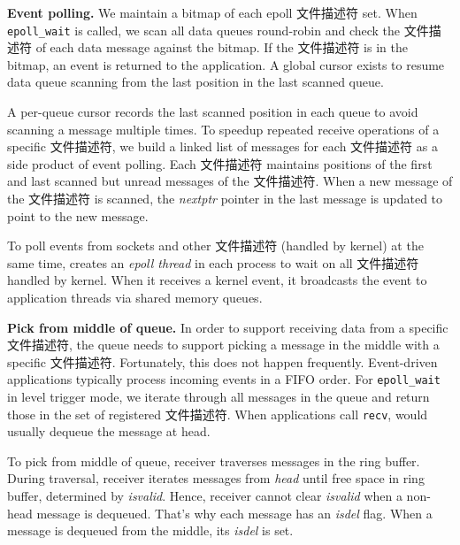 \textbf{Event polling.}
We maintain a bitmap of each epoll 文件描述符 set.
When \texttt{epoll\_wait} is called, we scan all data queues round-robin and check the 文件描述符 of each data message against the bitmap. If the 文件描述符 is in the bitmap, an event is returned to the application.
A global cursor exists to resume data queue scanning from the last position in the last scanned queue.

A per-queue cursor records the last scanned position in each queue to avoid scanning a message multiple times.
To speedup repeated receive operations of a specific 文件描述符, we build a linked list of messages for each 文件描述符 as a side product of event polling.
Each 文件描述符 maintains positions of the first and last scanned but unread messages of the 文件描述符.
When a new message of the 文件描述符 is scanned, the \emph{nextptr} pointer in the last message is updated to point to the new message.

To poll events from sockets and other 文件描述符 (handled by kernel) at the same time, \libipc{} creates an \textit{epoll thread} in each process to wait on all 文件描述符 handled by kernel. When it receives a kernel event, it broadcasts the event to application threads via shared memory queues. %

\textbf{Pick from middle of queue.}
In order to support receiving data from a specific 文件描述符, the queue needs to support picking a message in the middle with a specific 文件描述符.
Fortunately, this does not happen frequently. Event-driven applications typically process incoming events in a FIFO order. For \texttt{epoll\_wait} in level trigger mode, we iterate through all messages in the queue and return those in the set of registered 文件描述符. When applications call \texttt{recv}, \libipc{} would usually dequeue the message at head.

To pick from middle of queue, receiver traverses messages in the ring buffer. During traversal, receiver iterates messages from \textit{head} until free space in ring buffer, determined by \textit{isvalid}. Hence, receiver cannot clear \textit{isvalid} when a non-head message is dequeued. That's why each message has an \textit{isdel} flag. When a message is dequeued from the middle, its \textit{isdel} is set. %

